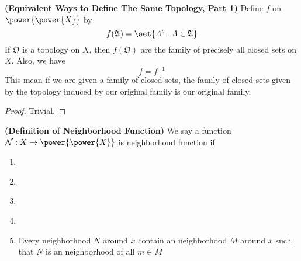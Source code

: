 \documentclass{report}
\begin{document}
\begin{theorem}
\label{2.1.3}
\textbf{(Equivalent Ways to Define The Same Topology, Part 1)} Define $f$ on $\power{\power{X}}$ by 
\begin{equation*}
f(\mathfrak{A})=\set{A^c:A\in \mathfrak{A}}
\end{equation*}
If $\mathfrak{O}$ is a topology on $X$, then  $f(\mathfrak{O})$ are the family of precisely all closed sets on $X$. Also, we have
\begin{equation*}
f=f^{-1}
\end{equation*}
This mean if we are given a family of closed sets, the family of closed sets given by the topology induced by our original family is our original family.   
\end{theorem}
\begin{proof}
Trivial. 
\end{proof}
\begin{definition}
\label{2.1.4}
\textbf{(Definition of Neighborhood Function)} We say a function $\mathcal{N}:X\rightarrow \power{\power{X}}$ is neighborhood function if 
\begin{enumerate}[label=(\alph*)]
  \item {}\\
  \item {}\\
  \item {}\\
  \item {}\\
  \item Every neighborhood $N$ around $x$ contain an neighborhood $M$ around $x$ such that $N$ is an neighborhood of all $m \in M$
\end{enumerate}
\end{definition}
\end{document}

